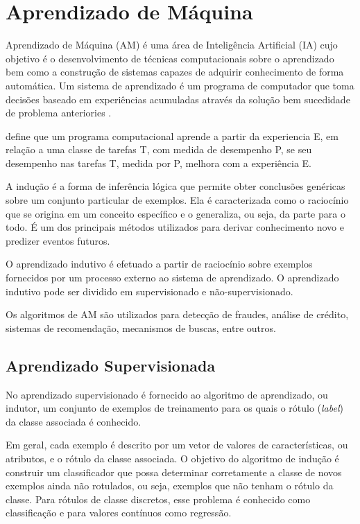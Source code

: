 \section{Aprendizado de Máquina}

Aprendizado de Máquina (AM) é uma área de Inteligência Artificial (IA) cujo objetivo é o desenvolvimento de técnicas computacionais sobre o aprendizado bem como a construção de sistemas capazes de adquirir conhecimento de forma automática. Um sistema de aprendizado é um programa de computador que toma decisões baseado em experiências acumuladas através da solução bem sucedidade de problema anteriories \cite{monard2003}. 

\cite{mitchell1997} define que um programa computacional aprende a partir da experiencia E, em relação a uma classe de tarefas T, com medida de desempenho P, se seu desempenho nas tarefas T, medida por P, melhora com a experiência E.


A indução é a forma de inferência lógica que permite obter conclusões genéricas sobre um
conjunto particular de exemplos. Ela é caracterizada como o raciocínio que se origina em um conceito específico e o generaliza, ou seja, da parte para o todo. É um dos principais métodos utilizados para derivar conhecimento novo e predizer eventos futuros. 


O aprendizado indutivo é efetuado a partir de raciocínio sobre exemplos fornecidos por um processo externo ao sistema de aprendizado. O aprendizado indutivo pode ser dividido em supervisionado e não-supervisionado. 

Os algoritmos de AM são utilizados para detecção de fraudes, análise de crédito, sistemas de recomendação, mecanismos de buscas, entre outros.



\subsection{Aprendizado Supervisionada}


No aprendizado supervisionado é fornecido ao algoritmo de aprendizado, ou indutor, um conjunto de exemplos de treinamento para os quais o rótulo (\textit{label}) da classe associada é conhecido.

Em geral, cada exemplo é descrito por um vetor de valores de características, ou atributos, e o rótulo da classe associada. O objetivo do algoritmo de indução é construir um classificador que possa determinar corretamente a classe de novos exemplos ainda não rotulados, ou seja, exemplos que não tenham o rótulo da classe. Para rótulos de classe discretos, esse problema é conhecido como classificação e para valores contínuos como regressão. \cite{monard2003}



